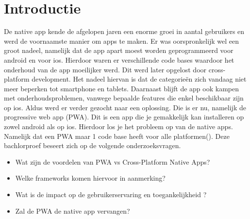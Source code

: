 \graphicspath{ {./Img/} }


\section{Introductie} %
\label{sec:introductie}
De native app kende de afgelopen jaren een enorme groei in aantal gebruikers en werd de voornaamste manier om apps te maken. Er was oorspronkelijk wel een groot nadeel, namelijk dat de app apart moest worden geprogrammeerd voor android en voor ios. Hierdoor waren er verschillende code bases waardoor het onderhoud van de app moeilijker werd. Dit werd later opgelost door cross-platform development. Het nadeel hiervan is dat de categorieën zich vandaag niet meer beperken tot smartphone en tablets. Daarnaast blijft de app ook kampen met onderhoudsproblemen, vanwege bepaalde features die enkel beschikbaar zijn op ios. Aldus werd er verder gezocht naar een oplossing. Die is er nu, namelijk de progressive web app (PWA). Dit is een app die je gemakkelijk kan installeren op zowel android als op ios. Hierdoor los je het probleem op van de native apps. Namelijk dat een PWA maar 1 code base heeft voor alle platformen(\cite{Why_PWA_over_NativeApp}).
Deze bachlorproef beseert zich op de volgende onderzoeksvragen.
\begin{itemize}
	\item Wat zijn de voordelen van PWA vs Cross-Platform Native Apps?
	\item Welke frameworks komen hiervoor in aanmerking?
	\item Wat is de impact op de gebruikerservaring en toegankelijkheid ?
	\item Zal de PWA de native app vervangen?
	
\end{itemize}




